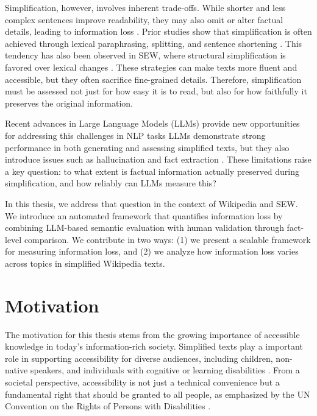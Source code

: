 \documentclass{DESSThesis}
\begin{document}
Simplification, however, involves inherent trade-offs. While shorter and less complex sentences improve readability, they may also omit or alter factual details, leading to information loss \cite{trienes2024infolossqacharacterizingrecoveringinformation}. Prior studies show that simplification is often achieved through lexical paraphrasing, splitting, and sentence shortening \cite{alva2020asset, nomoto2023does}. This tendency has also been observed in SEW, where structural simplification is favored over lexical changes \cite{coster2011simple,yasseri2012practical}. These strategies can make texts more fluent and accessible, but they often sacrifice fine-grained details\cite{trienes2024infolossqacharacterizingrecoveringinformation, agrawal2024text}. Therefore, simplification must be assessed not just for how easy it is to read, but also for how faithfully it preserves the original information\cite{trienes2024infolossqacharacterizingrecoveringinformation, agrawal2024text}.

Recent advances in Large Language Models (LLMs) provide new opportunities for addressing this challenges in NLP tasks \cite{kew2023bless, martínez2024exploringlargelanguagemodels,fang2025progressivedocumentleveltextsimplification} LLMs demonstrate strong performance in both generating and assessing simplified texts, but they also introduce issues such as hallucination and fact extraction \cite{farquhar2024detecting, huang2025survey, asgari2025framework, sawczyn2025factselfcheckfactlevelblackboxhallucination}. These limitations raise a key question: to what extent is factual information actually preserved during simplification, and how reliably can LLMs measure this?

In this thesis, we address that question in the context of Wikipedia and SEW. We introduce an automated framework that quantifies information loss by combining LLM-based semantic evaluation with human validation through fact-level comparison. We contribute in two ways: (1) we present a scalable framework for measuring information loss, and (2) we analyze how information loss varies across topics in simplified Wikipedia texts.

\section{Motivation}
The motivation for this thesis stems from the growing importance of accessible knowledge in today’s information-rich society. Simplified texts play a important role in supporting accessibility for diverse audiences, including children, non-native speakers, and individuals with cognitive or learning disabilities \cite{carroll1998practical, inui2003text,10.1145/1621995.1622002, de2010text, petersen2007text, allen2009study}. From a societal perspective, accessibility is not just a technical convenience but a fundamental right that should be granted to all people, as emphasized by the UN Convention on the Rights of Persons with Disabilities \cite{un_crpd_article9}.
\end{document}

